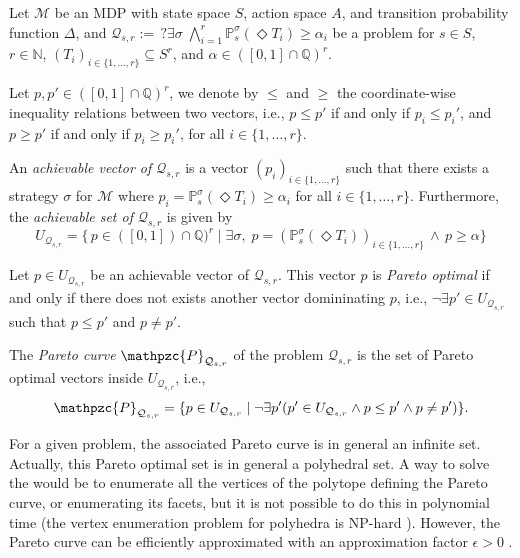 Let $\mathcal{M}$ be an MDP with state space $S$, action space $A$, and transition probability function $\Delta$, and
$
  \mathcal{Q}_{s, r} := \,?\exists \sigma\; \bigwedge_{i=1}^r \mathbb{P}^\sigma_s(\Diamond T_i) \geq \alpha_i
$
be a \MOSR{} problem for $s \in S$, $r \in \mathbb{N}$, $(T_i)_{i \in \{1, \dots, r\}} \subseteq S^r$, and $\alpha \in ([0, 1] \cap \mathbb{Q})^r$.

\begin{notation}
  Let $p, p' \in ([0, 1] \cap \mathbb{Q})^r$, we denote by $\leq$ and $\geq$ the coordinate-wise inequality relations between two vectors, i.e., $p \leq p'$ if and only if $p_i \leq p_i'$, and $p \geq p'$ if and only if $p_i \geq p_i'$, for all $i \in \{1, \dots, r\}$.
\end{notation}

\begin{definition}
An \textit{achievable vector of $\mathcal{Q}_{s, r}$} is a vector $(p_i)_{i \in \{1, \dots, r\}}$ such that there exists a strategy $\sigma$ for $\mathcal{M}$ where $p_i = \mathbb{P}^\sigma_s(\Diamond T_i) \geq \alpha_i$ for all $i \in \{1, \dots, r\}$.
Furthermore, the \textit{achievable set of $\mathcal{Q}_{s, r}$} is given by
\[U_{\mathcal{Q}_{s, r}} = \{ \, p \in ([0, 1]) \cap \mathbb{Q})^r \; | \; \exists \sigma, \; p = (\mathbb{P}_s^\sigma (\Diamond T_i))_{i \in \{1, \dots, r\}} \, \wedge \, p \geq \alpha \}\]
\end{definition}

\begin{definition}
  Let $p \in U_{\mathcal{Q}_{s, r}}$ be an achievable vector of $\mathcal{Q}_{s, r}$.
  This vector $p$ is \textit{Pareto optimal} if and only if there does not exists another vector domininating $p$, i.e., $\neg \exists p' \in U_{\mathcal{Q}_{s, r}}$ such that $p \leq p'$ and $p \neq p'$.
\end{definition}

\begin{definition}
  The \textit{Pareto curve} $\mathpzc{P}_{\mathcal{Q}_{s, r}}$
  of the \MOSR{} problem $\mathcal{Q}_{s, r}$ is the set of Pareto optimal vectors inside $U_{\mathcal{Q}_{s, r}}$, i.e.,
  \[
    \mathpzc{P}_{\mathcal{Q}_{s, r}} =
    \{ p \in U_{\mathcal{Q}_{s, r}} \; | \;
    \neg \exists p'(p' \in U_{\mathcal{Q}_{s, r}} \wedge p \leq p' \wedge p \neq p')\}.
  \]
\end{definition}
For a given \MOSR{} problem, the associated Pareto curve is in general an infinite set.
Actually, this Pareto optimal set is in general a polyhedral set. %
A way to solve the \MOSR{} would be to enumerate all the vertices of the polytope defining the Pareto curve, or enumerating its facets, but it is not possible to do this in polynomial time (the vertex enumeration problem for polyhedra is NP-hard \cite{Boros09generatingvertices}).
However, the Pareto curve can be efficiently approximated with an approximation factor $\epsilon > 0$ \cite{DBLP:conf/focs/PapadimitriouY00}.

